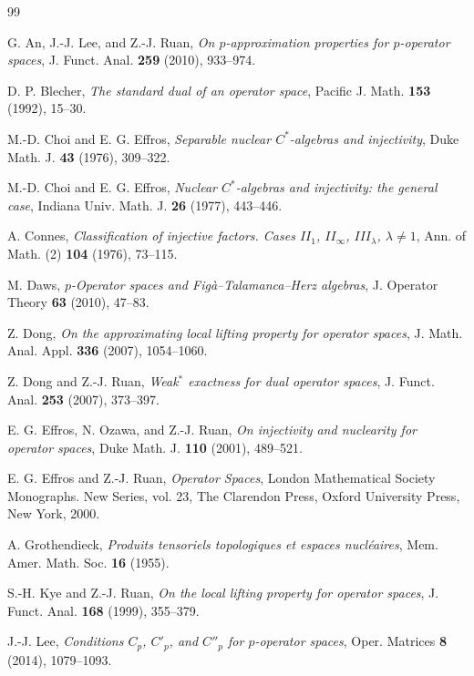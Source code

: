 \documentclass[12pt]{article}
\begin{document}
\begin{thebibliography}{99}

G. An, J.-J. Lee, and Z.-J. Ruan,
\emph{On $p$-approximation properties for $p$-operator spaces},
J. Funct. Anal. \textbf{259} (2010), 933--974.

D. P. Blecher,
\emph{The standard dual of an operator space},
Pacific J. Math. \textbf{153} (1992), 15--30.

M.-D. Choi and E. G. Effros,
\emph{Separable nuclear $C^*$-algebras and injectivity},
Duke Math. J. \textbf{43} (1976), 309--322.

M.-D. Choi and E. G. Effros,
\emph{Nuclear $C^*$-algebras and injectivity: the general case},
Indiana Univ. Math. J. \textbf{26} (1977), 443--446.

A. Connes,
\emph{Classification of injective factors. Cases $II_1$, $II_\infty$, $III_\lambda$, $\lambda \ne 1$},
Ann. of Math. (2) \textbf{104} (1976), 73--115.

M. Daws,
\emph{$p$-Operator spaces and Fig\`a--Talamanca--Herz algebras},
J. Operator Theory \textbf{63} (2010), 47--83.

Z. Dong,
\emph{On the approximating local lifting property for operator spaces},
J. Math. Anal. Appl. \textbf{336} (2007), 1054--1060.


Z. Dong and Z.-J. Ruan,
\emph{Weak$^*$ exactness for dual operator spaces},
J. Funct. Anal. \textbf{253} (2007), 373--397.

E. G. Effros, N. Ozawa, and Z.-J. Ruan,
\emph{On injectivity and nuclearity for operator spaces},
Duke Math. J. \textbf{110} (2001), 489--521.

E. G. Effros and Z.-J. Ruan,
\emph{Operator Spaces},
London Mathematical Society Monographs. New Series, vol. 23, The Clarendon Press, Oxford University Press, New York, 2000.

A. Grothendieck,
\emph{Produits tensoriels topologiques et espaces nucl\'eaires},
Mem. Amer. Math. Soc. \textbf{16} (1955).

S.-H. Kye and Z.-J. Ruan,
\emph{On the local lifting property for operator spaces},
J. Funct. Anal. \textbf{168} (1999), 355--379.

J.-J. Lee,
\emph{Conditions $C_p$, $C'_p$, and $C''_p$ for $p$-operator spaces},
Oper. Matrices \textbf{8} (2014), 1079--1093.


\end{thebibliography}
\end{document}
